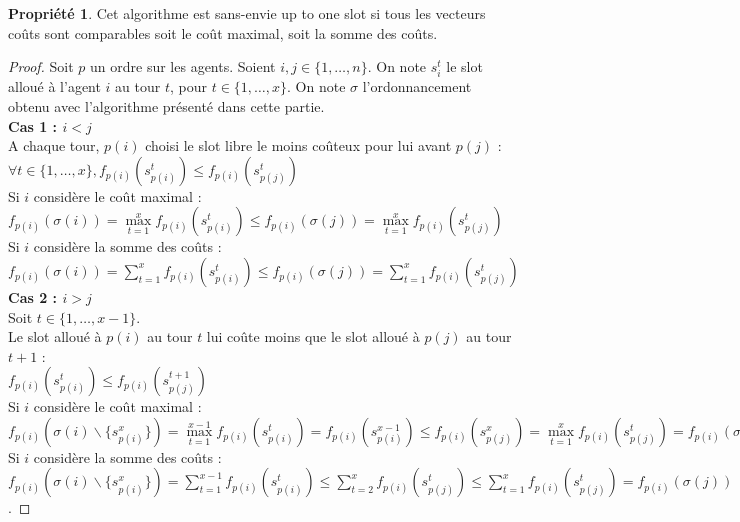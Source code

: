 \documentclass[12pt]{article}
\theoremstyle{definition}
\newtheorem{prop}{Propriété}
\begin{document}
\begin{prop}
Cet algorithme est sans-envie up to one slot si tous les vecteurs coûts sont comparables soit le coût maximal, soit la somme des coûts.
\end{prop}

\begin{proof}
Soit $p$ un ordre sur les agents. Soient $i, j \in \{1, \dots, n\}$. On note $s_i^t$ le slot alloué à l'agent $i$ au tour $t$, pour $t\in\{1,\dots,x\}$. On note $\sigma$ l'ordonnancement obtenu avec l'algorithme présenté dans cette partie.\\
\textbf{Cas 1 : $i<j$}\\
A chaque tour, $p(i)$ choisi le slot libre le moins coûteux pour lui avant $p(j)$ :\\
 $\forall t\in \{1, \dots, x\}, f_{p(i)}(s^t_{p(i)})\leq f_{p(i)}(s^t_{p(j)})$\\
 Si $i$ considère le coût maximal : $f_{p(i)}(\sigma(i)) = \max\limits_{t = 1}^x f_{p(i)}(s^t_{p(i)}) \leq f_{p(i)}(\sigma(j)) = \max\limits_{t = 1}^x f_{p(i)}(s^t_{p(j)})$\\
 Si $i$ considère la somme des coûts : $f_{p(i)}(\sigma(i)) = \sum\limits_{t = 1}^x f_{p(i)}(s^t_{p(i)})\leq f_{p(i)}(\sigma(j)) = \sum\limits_{t = 1}^x f_{p(i)}(s^t_{p(j)})$\\
\textbf{Cas 2 : $i>j$}\\
Soit $t\in\{1,\dots,x-1\}$.\\
Le slot alloué à $p(i)$ au tour $t$ lui coûte moins que le slot alloué à $p(j)$ au tour $t+1$ : \\
$f_{p(i)}(s^t_{p(i)})\leq f_{p(i)}(s^{t+1}_{p(j)})$\\
Si $i$ considère le coût maximal : \\
$f_{p(i)}(\sigma(i)\backslash\{s_{p(i)}^x\}) = \max\limits_{t = 1}^{x-1} f_{p(i)}(s^t_{p(i)}) = f_{p(i)}(s^{x-1}_{p(i)}) \leq f_{p(i)}(s^x_{p(j)}) = \max\limits_{t = 1}^{x} f_{p(i)}(s^t_{p(j)}) = f_{p(i)}(\sigma(j))$\\
Si $i$ considère la somme des coûts : \\
$f_{p(i)}(\sigma(i)\backslash\{s_{p(i)}^x\}) = \sum\limits_{t = 1}^{x-1} f_{p(i)}(s^t_{p(i)}) \leq \sum\limits_{t = 2}^{x} f_{p(i)}(s^t_{p(j)}) \leq \sum\limits_{t = 1}^{x} f_{p(i)}(s^t_{p(j)}) = f_{p(i)}(\sigma(j))$.
\end{proof}
\end{document}
